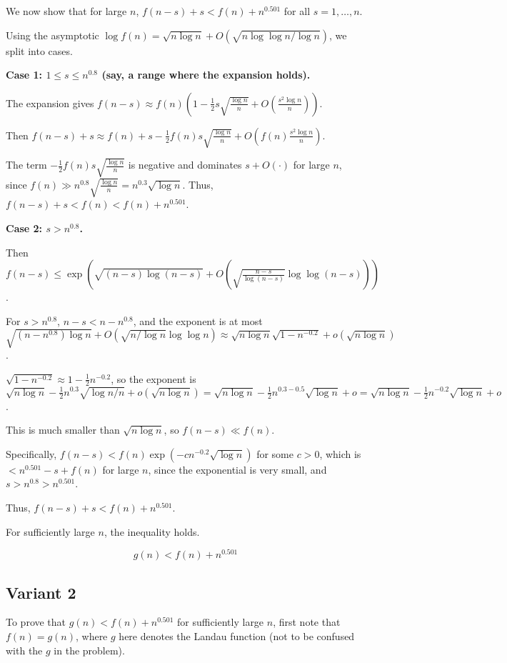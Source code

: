\documentclass[12pt,a4paper]{article}
\theoremstyle{definition}
\begin{document}
    We now show that for large $n$, $f(n - s) + s < f(n) + n^{0.501}$ for all $s = 1, \ldots, n$.

    Using the asymptotic $\log f(n) = \sqrt{n \log n} + O(\sqrt{n \log \log n / \log n})$, we split into cases.

    \textbf{Case 1: $1 \leq s \leq n^{0.8}$ (say, a range where the expansion holds).}

    The expansion gives $f(n - s) \approx f(n) \left(1 - \frac{1}{2} s \sqrt{\frac{\log n}{n}} + O\left(\frac{s^2 \log n}{n}\right)\right)$.

    Then $f(n - s) + s \approx f(n) + s - \frac{1}{2} f(n) s \sqrt{\frac{\log n}{n}} + O\left(f(n) \frac{s^2 \log n}{n}\right)$.

    The term $-\frac{1}{2} f(n) s \sqrt{\frac{\log n}{n}}$ is negative and dominates $s + O(\cdot)$ for large $n$, since $f(n) \gg n^{0.8} \sqrt{\frac{\log n}{n}} = n^{0.3} \sqrt{\log n}$. Thus, $f(n - s) + s < f(n) < f(n) + n^{0.501}$.

    \textbf{Case 2: $s > n^{0.8}$.}

    Then $f(n - s) \leq \exp\left( \sqrt{(n - s) \log (n - s)} + O\left(\sqrt{\frac{n - s}{\log (n - s)}} \log \log (n - s)\right) \right)$.

    For $s > n^{0.8}$, $n - s < n - n^{0.8}$, and the exponent is at most $\sqrt{(n - n^{0.8}) \log n} + O(\sqrt{n / \log n} \log \log n) \approx \sqrt{n \log n} \sqrt{1 - n^{-0.2}} + o(\sqrt{n \log n})$.

    $\sqrt{1 - n^{-0.2}} \approx 1 - \frac{1}{2} n^{-0.2}$, so the exponent is $\sqrt{n \log n} - \frac{1}{2} n^{0.3} \sqrt{\log n / n} + o(\sqrt{n \log n}) = \sqrt{n \log n} - \frac{1}{2} n^{0.3 - 0.5} \sqrt{\log n} + o = \sqrt{n \log n} - \frac{1}{2} n^{-0.2} \sqrt{\log n} + o$.

    This is much smaller than $\sqrt{n \log n}$, so $f(n - s) \ll f(n)$.

    Specifically, $f(n - s) < f(n) \exp\left( - c n^{-0.2} \sqrt{\log n} \right)$ for some $c > 0$, which is $< n^{0.501} - s + f(n)$ for large $n$, since the exponential is very small, and $s > n^{0.8} > n^{0.501}$.

    Thus, $f(n - s) + s < f(n) + n^{0.501}$.

    For sufficiently large $n$, the inequality holds.

    $$\boxed{g(n) < f(n) + n^{0.501}}$$
\subsection{Variant 2}
    To prove that $g(n) < f(n) + n^{0.501}$ for sufficiently large $n$, first note that $f(n) = g(n)$, where $g$ here denotes the Landau function (not to be confused with the $g$ in the problem).
\end{document}
